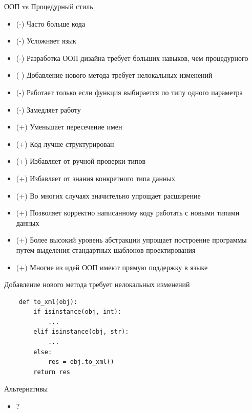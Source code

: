 \documentclass{article}
\begin{document}
\begin{center} ООП vs Процедурный стиль \end{center}
\begin{itemize}
    \item (-) Часто больше кода
    \item (-) Усложняет язык
    \item (-) Разработка ООП дизайна требует больших навыков, чем процедурного
    \item (-) Добавление нового метода требует нелокальных изменений
    \item (-) Работает только если функция выбирается по типу одного параметра
    \item (-) Замедляет работу

    \item (+) Уменьшает пересечение имен
    \item (+) Код лучше структурирован
    \item (+) Избавляет от ручной проверки типов
    \item (+) Избавляет от знания конкретного типа данных
    \item (+) Во многих случаях значительно упрощает расширение
    \item (+) Позволяет корректно написанному коду работать с новыми типами данных
    \item (+) Более высокий уровень абстракции упрощает построение программы
              путем выделения стандартных шаблонов проектирования
    \item (+) Многие из идей ООП имеют прямую поддержку в языке
\end{itemize}
\newpage

\begin{center} Добавление нового метода требует нелокальных изменений \end{center}
\begin{lstlisting}
    def to_xml(obj):
        if isinstance(obj, int):
            ...
        elif isinstance(obj, str):
            ...
        else:
            res = obj.to_xml()
        return res
\end{lstlisting}
\newpage

\begin{center} Альтернативы \end{center}
\begin{itemize}
    \item ?
\end{itemize}
\newpage
\end{document}
